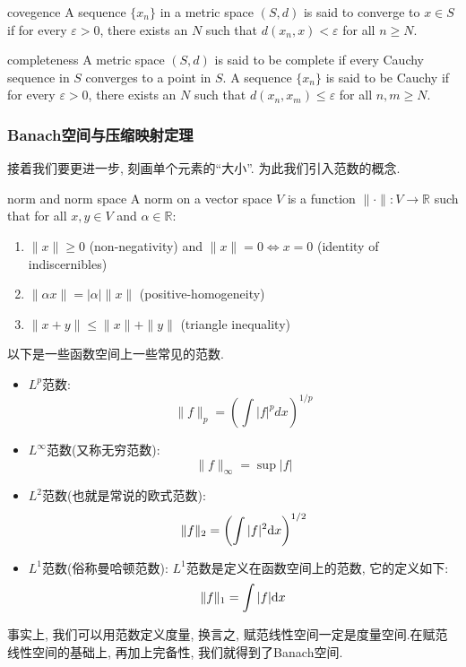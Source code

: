 \begin{definition}{covegence}
    A sequence $\{x_n\}$ in a metric space $(S, d)$ is said to converge to $x \in S$ if for every $\varepsilon > 0$, there exists an $N$ such that $d(x_n, x) < \varepsilon$ for all $n \geq N$.
\end{definition}

\begin{definition}{completeness}
    A metric space $(S, d)$ is said to be complete if every Cauchy sequence in $S$ converges to a point in $S$. 
    A sequence $\{x_n\}$ is said to be Cauchy if for every $\varepsilon > 0$, there exists an $N$ such that $d(x_n, x_m) \leq  \varepsilon$ for all $n, m \geq N$.
\end{definition}
\newpage

\subsubsection{Banach空间与压缩映射定理}
接着我们要更进一步, 刻画单个元素的“大小”. 为此我们引入范数的概念.
\begin{definition}{norm and norm space}
    A norm on a vector space $V$ is a function $\|\cdot\|: V \to \mathbb{R}$ such that for all $x, y \in V$ and $\alpha \in \mathbb{R}$:
    \begin{enumerate}
        \item $\|x\| \geq 0$ (non-negativity) and $\|x\| = 0 \iff x = 0$ (identity of indiscernibles)
        \item $\|\alpha x\| = |\alpha| \|x\|$ (positive-homogeneity)
        \item $\|x + y\| \leq \|x\| + \|y\|$ (triangle inequality)
    \end{enumerate}
\end{definition}
以下是一些函数空间上一些常见的范数.
\begin{itemize}
    \item $L^p$范数:
        $$\|f\|_p = \left(\int |f|^p dx\right)^{1/p}$$
    \item $L^\infty$范数(又称无穷范数): 
        $$\|f\|_\infty = \sup |f|$$
    \item $L^2$范数(也就是常说的欧式范数): 
        $$\|f\|_2 = \left(\int |f|^2 {\rm d}x\right)^{1/2}$$
    \item $L^1$范数(俗称曼哈顿范数): $L^1$范数是定义在函数空间上的范数, 它的定义如下:
        $$\|f\|_1 = \int |f| {\rm d}x$$
\end{itemize}
事实上, 我们可以用范数定义度量, 换言之, 赋范线性空间一定是度量空间.在赋范线性空间的基础上, 再加上完备性, 我们就得到了Banach空间.
